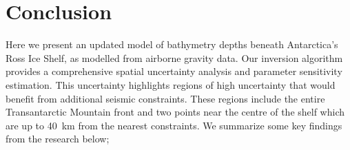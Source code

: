 




\section{Conclusion}

Here we present an updated model of bathymetry depths beneath Antarctica's Ross Ice Shelf, as modelled from airborne gravity data. Our inversion algorithm provides a comprehensive spatial uncertainty analysis and parameter sensitivity estimation. This uncertainty highlights regions of high uncertainty that would benefit from additional seismic constraints. These regions include the entire Transantarctic Mountain front and two points near the centre of the shelf which are up to 40~km from the nearest constraints. We summarize some key findings from the research below;

